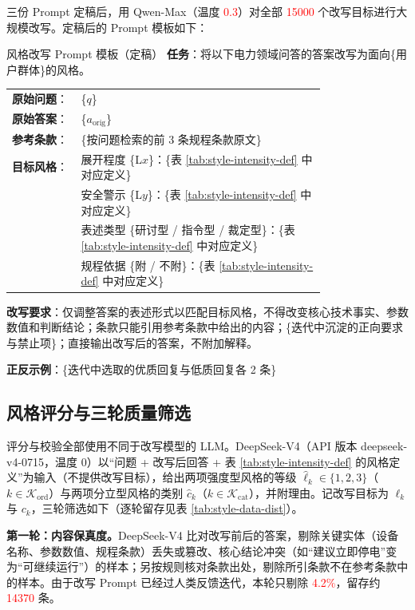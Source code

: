 \documentclass[fontset=fandol,type=master,campus=shenzhen,etitleauto=true]{hithesisbook}
\newcommand{\rev}[1]{\textcolor{red}{#1}}
\begin{document}
三份 Prompt 定稿后，用 Qwen-Max（温度 \rev{0.3}）对全部 \rev{15000} 个改写目标进行大规模改写。定稿后的 Prompt 模板如下：

\begin{promptbox}{风格改写 Prompt 模板（定稿）}
\textbf{任务}：将以下电力领域问答的答案改写为面向\{用户群体\}的风格。\par\smallskip
\begin{tabular}{@{}l@{\;}p{0.78\linewidth}@{}}
\textbf{原始问题}： & \{$q$\} \\
\textbf{原始答案}： & \{$a_{\text{orig}}$\} \\
\textbf{参考条款}： & \{按问题检索的前 3 条规程条款原文\} \\
\textbf{目标风格}： & 展开程度 \{L$x$\}：\{表 \ref{tab:style-intensity-def} 中对应定义\} \\
 & 安全警示 \{L$y$\}：\{表 \ref{tab:style-intensity-def} 中对应定义\} \\
 & 表述类型 \{研讨型 / 指令型 / 裁定型\}：\{表 \ref{tab:style-intensity-def} 中对应定义\} \\
 & 规程依据 \{附 / 不附\}：\{表 \ref{tab:style-intensity-def} 中对应定义\} \\
\end{tabular}\par\smallskip
\textbf{改写要求}：仅调整答案的表述形式以匹配目标风格，不得改变核心技术事实、参数数值和判断结论；条款只能引用参考条款中给出的内容；\{迭代中沉淀的正向要求与禁止项\}；直接输出改写后的答案，不附加解释。\par\smallskip
\textbf{正反示例}：\{迭代中选取的优质回复与低质回复各 2 条\}
\end{promptbox}

\subsection{风格评分与三轮质量筛选}\label{ux4e09ux8f6eux8d28ux91cfux7b5bux9009}

评分与校验全部使用不同于改写模型的 LLM。DeepSeek-V4（API 版本 deepseek-v4-0715，温度 0）以“问题 + 改写后回答 + 表 \ref{tab:style-intensity-def} 的风格定义”为输入（不提供改写目标），给出两项强度型风格的等级 $\hat{\ell}_k \in \{1, 2, 3\}$（$k \in \mathcal{K}_{\text{ord}}$）与两项分立型风格的类别 $\hat{c}_k$（$k \in \mathcal{K}_{\text{cat}}$），并附理由。记改写目标为 $\ell_k$ 与 $c_k$，三轮筛选如下（逐轮留存见表 \ref{tab:style-data-dist}）。

\textbf{第一轮：内容保真度。}DeepSeek-V4 比对改写前后的答案，剔除关键实体（设备名称、参数数值、规程条款）丢失或篡改、核心结论冲突（如“建议立即停电”变为“可继续运行”）的样本；另按规则核对条款出处，剔除所引条款不在参考条款中的样本。由于改写 Prompt 已经过人类反馈迭代，本轮只剔除 \rev{4.2\%}，留存约 \rev{14370} 条。
\end{document}
